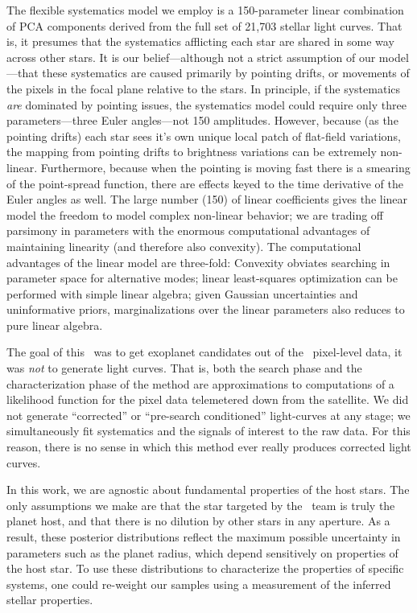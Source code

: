 The flexible systematics model we employ is a 150-parameter linear combination
of PCA components derived from the full set of 21,703 stellar light curves.
That is, it presumes that the systematics afflicting each star are shared in
some way across other stars.
It is our belief---although not a strict assumption of our model---that these
systematics are caused primarily by pointing drifts, or movements of the
pixels in the focal plane relative to the stars.
In principle, if the systematics \emph{are} dominated by pointing issues, the
systematics model could require only three parameters---three Euler
angles---not 150 amplitudes.
However, because (as the pointing drifts) each star sees it's own unique
local patch of flat-field variations, the mapping from pointing drifts to
brightness variations can be extremely non-linear.
Furthermore, because when the pointing is moving fast there is a smearing of
the point-spread function, there are effects keyed to the time derivative of
the Euler angles as well.
The large number (150) of linear coefficients gives the linear model the
freedom to model complex non-linear behavior; we are trading off parsimony
in parameters with the enormous computational advantages of maintaining
linearity (and therefore also convexity).
The computational advantages of the linear model are three-fold:
Convexity obviates searching in parameter space for alternative modes;
linear least-squares optimization can be performed with simple linear algebra;
given Gaussian uncertainties and uninformative priors, marginalizations over
the linear parameters also reduces to pure linear algebra.

The goal of this \paper\ was to get exoplanet candidates out of the
\KT\ pixel-level data, it was \emph{not} to generate light curves.
That is, both the search phase and the characterization phase of the method
are approximations to computations of a likelihood function for the pixel
data telemetered down from the satellite.
We did not generate ``corrected'' or ``pre-search conditioned'' light-curves
at any stage; we simultaneously fit systematics and the signals of interest
to the raw data.
For this reason, there is no sense in which this method ever really
produces corrected light curves.

In this work, we are agnostic about fundamental properties of the host stars.
The only assumptions we make are that the star targeted by the \KT\
team is truly the planet host, and that there is no dilution by other stars in
any aperture.
As a result, these posterior distributions reflect the maximum possible
uncertainty in parameters such as the planet radius, which depend sensitively
on properties of the host star.
To use these distributions to characterize the properties of specific systems,
one could re-weight our samples using a measurement of the inferred stellar
properties.

